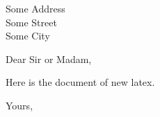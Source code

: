 \documentclass{letter}
\begin{document}
\begin{letter}{Some Address\\Some Street\\Some City}

\opening{Dear Sir or Madam,}

Here is the document of new latex.

\closing{Yours,}

\end{letter}
\end{document}
